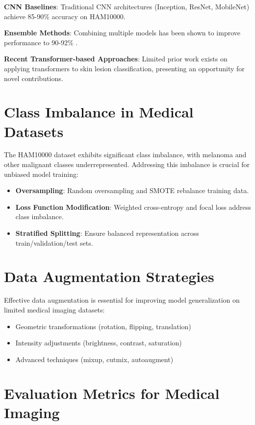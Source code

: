 \textbf{CNN Baselines}: Traditional CNN architectures (Inception, ResNet, MobileNet) achieve 85-90\% accuracy on HAM10000.

\textbf{Ensemble Methods}: Combining multiple models has been shown to improve performance to 90-92\% \cite{esteva2019dermatologist}.

\textbf{Recent Transformer-based Approaches}: Limited prior work exists on applying transformers to skin lesion classification, presenting an opportunity for novel contributions.

\section{Class Imbalance in Medical Datasets}

The HAM10000 dataset exhibits significant class imbalance, with melanoma and other malignant classes underrepresented. Addressing this imbalance is crucial for unbiased model training:

\begin{itemize}
    \item \textbf{Oversampling}: Random oversampling and SMOTE rebalance training data.
    \item \textbf{Loss Function Modification}: Weighted cross-entropy and focal loss address class imbalance.
    \item \textbf{Stratified Splitting}: Ensure balanced representation across train/validation/test sets.
\end{itemize}

\section{Data Augmentation Strategies}

Effective data augmentation is essential for improving model generalization on limited medical imaging datasets:

\begin{itemize}
    \item Geometric transformations (rotation, flipping, translation)
    \item Intensity adjustments (brightness, contrast, saturation)
    \item Advanced techniques (mixup, cutmix, autoaugment)
\end{itemize}

\section{Evaluation Metrics for Medical Imaging}

